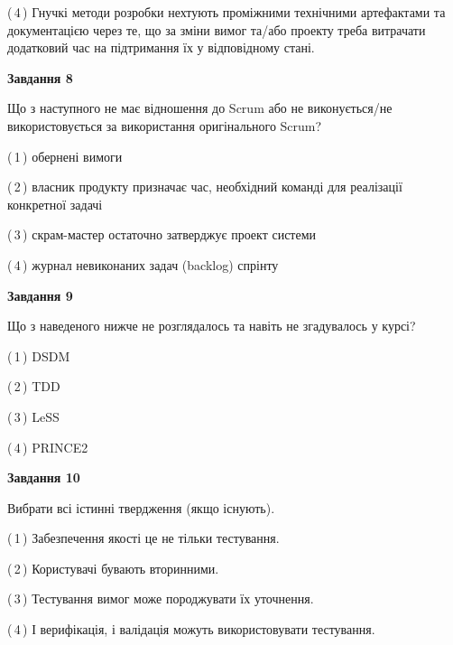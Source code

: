 \documentclass[10pt, ukrainian]{article}
\begin{document}
{\begin {large}
(\,4\,) Гнучкі методи розробки нехтують проміжними технічними артефактами та документацією через те, що за зміни вимог та/або проекту треба витрачати додатковий час на підтримання їх у відповідному стані. %


{\begin {center}\textbf{Завдання 8}\end {center}}\par
Що з наступного не має відношення до Scrum або не виконується/не використовується за використання оригінального Scrum?\par
\vspace{2mm}



(\,1\,) обернені вимоги%



(\,2\,) власник продукту призначає час, необхідний команді для реалізації конкретної задачі%



(\,3\,) скрам-мастер остаточно затверджує проект системи%



(\,4\,) журнал невиконаних задач (backlog) спрінту%


{\begin {center}\textbf{Завдання 9}\end {center}}\par
Що з наведеного нижче не розглядалось та навіть не згадувалось у курсі?\par
\vspace{2mm}



(\,1\,) DSDM%



(\,2\,) TDD%



(\,3\,) LeSS%



(\,4\,) PRINCE2%


{\begin {center}\textbf{Завдання 10}\end {center}}\par
Вибрати всі істинні твердження (якщо існують).\par
\vspace{2mm}



(\,1\,) Забезпечення якості це не тільки тестування.%



(\,2\,) Користувачі бувають вторинними.%



(\,3\,) Тестування вимог може породжувати їх уточнення.%



(\,4\,) І верифікація, і валідація можуть використовувати тестування.%



\end {large}}
\end{document}
